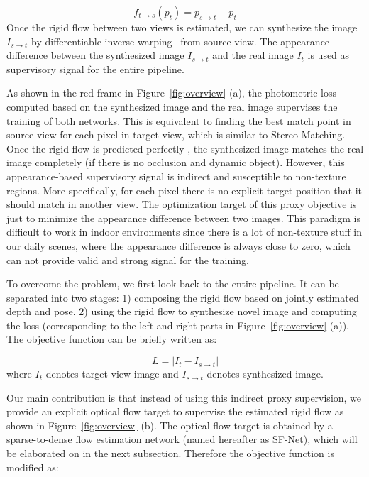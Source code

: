 \documentclass[10pt,twocolumn,letterpaper]{article}
\begin{document}
\begin{equation}
    f_{t\xrightarrow{}s}(p_t) = p_{s\xrightarrow{}t} - p_t
\end{equation}
Once the rigid flow between two views is estimated, we can synthesize the image $I_{s\xrightarrow{}t}$ by differentiable inverse warping~\cite{jaderberg2015spatial} from source view. The appearance difference between the synthesized image $I_{s\xrightarrow{}t}$ and the real image $I_t$ is used as supervisory signal for the entire pipeline.

As shown in the red frame in Figure~\ref{fig:overview} (a), the photometric loss computed based on the synthesized image and the real image supervises the training of both networks. This is equivalent to finding the best match point in source view for each pixel in target view, which is similar to Stereo Matching. Once the rigid flow is predicted perfectly , the synthesized image matches the real image completely (if there is no occlusion and dynamic object). However, this appearance-based supervisory signal is indirect and susceptible to non-texture regions. More specifically, for each pixel there is no explicit target position that it should match in another view. The optimization target of this proxy objective is just to minimize the appearance difference between two images. This paradigm is difficult to work in indoor environments since there is a lot of non-texture stuff in our daily scenes, where the appearance difference is always close to zero, which can not provide valid and strong signal for the training.

To overcome the problem, we first look back to the entire pipeline. It can be separated into two stages: 1) composing the rigid flow based on jointly estimated depth and pose. 2) using the rigid flow to synthesize novel image and computing the loss (corresponding to the left and right parts in Figure~\ref{fig:overview} (a)). The objective function can be briefly written as:

\begin{equation}
    L = |{I_t - I_{s\xrightarrow{}t} } |
\end{equation}
where $I_t$ denotes target view image and $I_{s\xrightarrow{}t}$ denotes synthesized image. 

Our main contribution is that instead of using this indirect proxy supervision, we provide an explicit optical flow target to supervise the estimated rigid flow as shown in Figure~\ref{fig:overview} (b). The optical flow target is obtained by a sparse-to-dense flow estimation network (named hereafter as SF-Net), which will be elaborated on in the next subsection. Therefore the objective function is modified as:
\end{document}
